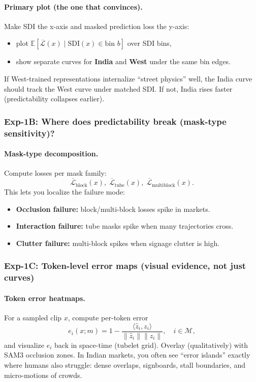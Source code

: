 \paragraph{Primary plot (the one that convinces).}
Make SDI the x-axis and masked prediction loss the y-axis:
\begin{itemize}[leftmargin=*,itemsep=2pt]
  \item plot $\mathbb{E}[\overline{\mathcal{L}}(x)\mid \mathrm{SDI}(x)\in \text{bin }b]$ over SDI bins,
  \item show separate curves for \textbf{India} and \textbf{West} under the same bin edges.
\end{itemize}
If West-trained representations internalize “street physics” well, the India curve should track the West curve under matched SDI. If not, India rises faster (predictability collapses earlier).

\subsubsection{Exp-1B: Where does predictability break (mask-type sensitivity)?}

\paragraph{Mask-type decomposition.}
Compute losses per mask family:
\[
\overline{\mathcal{L}}_{\mathrm{block}}(x),\;
\overline{\mathcal{L}}_{\mathrm{tube}}(x),\;
\overline{\mathcal{L}}_{\mathrm{multiblock}}(x).
\]
This lets you localize the failure mode:
\begin{itemize}[leftmargin=*,itemsep=2pt]
  \item \textbf{Occlusion failure:} block/multi-block losses spike in markets.
  \item \textbf{Interaction failure:} tube masks spike when many trajectories cross.
  \item \textbf{Clutter failure:} multi-block spikes when signage clutter is high.
\end{itemize}

\subsubsection{Exp-1C: Token-level error maps (visual evidence, not just curves)}

\paragraph{Token error heatmaps.}
For a sampled clip $x$, compute per-token error
\[
e_i(x;m) = 1 - \frac{\langle \hat{z}_i, z_i \rangle}{\|\hat{z}_i\|\|z_i\|}, \quad i\in\mathcal{M},
\]
and visualize $e_i$ back in space-time (tubelet grid). Overlay (qualitatively) with SAM3 occlusion zones. In Indian markets, you often see “error islands” exactly where humans also struggle: dense overlaps, signboards, stall boundaries, and micro-motions of crowds.

